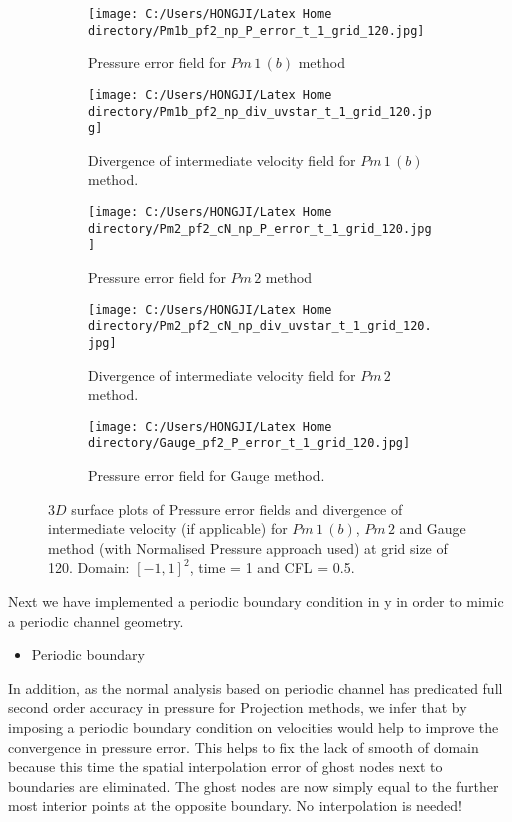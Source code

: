 \begin{figure}[H]
	\centering
	\begin{subfigure}[t]{2.5in}
		\centering
		\texttt{[image: C:/Users/HONGJI/Latex Home directory/Pm1b\_pf2\_np\_P\_error\_t\_1\_grid\_120.jpg]}
		\caption{Pressure error field for $Pm\,1\,(b)$ method}\label{fig:6.19a}		
	\end{subfigure}
	\quad
	\begin{subfigure}[t]{2.6in}
		\centering
		\texttt{[image: C:/Users/HONGJI/Latex Home directory/Pm1b\_pf2\_np\_div\_uvstar\_t\_1\_grid\_120.jpg]}
		\caption{Divergence of intermediate velocity field for $Pm\,1\,(b)$ method. }\label{fig:6.19b}
	\end{subfigure}
	\quad
	\centering
	\begin{subfigure}[t]{2.5in}
		\centering
		\texttt{[image: C:/Users/HONGJI/Latex Home directory/Pm2\_pf2\_cN\_np\_P\_error\_t\_1\_grid\_120.jpg]}
		\caption{Pressure error field for $Pm\,2$ method}\label{fig:6.19c}		
	\end{subfigure}
	\quad
	\begin{subfigure}[t]{2.6in}
		\centering
		\texttt{[image: C:/Users/HONGJI/Latex Home directory/Pm2\_pf2\_cN\_np\_div\_uvstar\_t\_1\_grid\_120.jpg]}
		\caption{Divergence of intermediate velocity field for $Pm\,2$ method.}\label{fig:6.19d}
	\end{subfigure}
	\quad
	\begin{subfigure}[t]{2.6in}
		\centering
		\texttt{[image: C:/Users/HONGJI/Latex Home directory/Gauge\_pf2\_P\_error\_t\_1\_grid\_120.jpg]}
		\caption{Pressure error field for Gauge method. }\label{fig:6.19d}
	\end{subfigure}
	\caption{$3D$ surface plots of Pressure error fields and divergence of intermediate velocity (if applicable) for $Pm\,1\,(b)$, $Pm\,2$ and Gauge method (with Normalised Pressure approach used) at grid size of 120. Domain: $[-1,1]^2$, time = 1 and CFL = 0.5. }\label{fig:6.16}
\end{figure}

Next we have implemented a periodic boundary condition in y in order to mimic a periodic channel geometry.

\begin{itemize}
\item Periodic boundary
\end{itemize}
In addition, as the normal analysis based on periodic channel has predicated full second order accuracy in pressure for Projection methods, we infer that by imposing a periodic boundary condition on velocities would help to improve the convergence in pressure error. This helps to fix the lack of smooth of domain because this time the spatial interpolation error of ghost nodes next to boundaries are eliminated. The ghost nodes are now simply equal to the further most interior points at the opposite boundary. No interpolation is needed!\\

